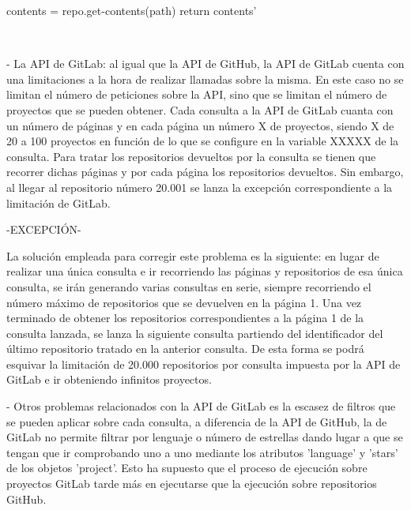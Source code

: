     contents = repo.get-contents(path)
    return contents'

\\
	
- La API de GitLab: al igual que la API de GitHub, la API de GitLab cuenta con una limitaciones a la hora de realizar llamadas sobre la misma. En este caso no se limitan el número de peticiones sobre la API, sino que se limitan el número de proyectos que se pueden obtener.
Cada consulta a la API de GitLab cuanta con un número de páginas y en cada página un número X de proyectos, siendo X de 20 a 100 proyectos en función de lo que se configure en la variable XXXXX de la consulta. Para tratar los repositorios devueltos por la consulta se tienen que recorrer dichas páginas y por cada página los repositorios devueltos. Sin embargo, al llegar al repositorio número 20.001 se lanza la excepción correspondiente a la limitación de GitLab.

-EXCEPCIÓN-

La solución empleada para corregir este problema es la siguiente: en lugar de realizar una única consulta e ir recorriendo las páginas y repositorios de esa única consulta, se irán generando varias consultas en serie, siempre recorriendo el número máximo de repositorios que se devuelven en la página 1. Una vez terminado de obtener los repositorios correspondientes a la página 1 de la consulta lanzada, se lanza la siguiente consulta partiendo del identificador del último repositorio tratado en la anterior consulta. De esta forma se podrá esquivar la limitación de 20.000 repositorios por consulta impuesta por la API de GitLab e ir obteniendo infinitos proyectos.

- Otros problemas relacionados con la API de GitLab es la escasez de filtros que se pueden aplicar sobre cada consulta, a diferencia de la API de GitHub, la de GitLab no permite filtrar por lenguaje o número de estrellas dando lugar a que se tengan que ir comprobando uno a uno mediante los atributos 'language' y 'stars' de los objetos 'project'. Esto ha supuesto que el proceso de ejecución sobre proyectos GitLab tarde más en ejecutarse que la ejecución sobre repositorios GitHub.